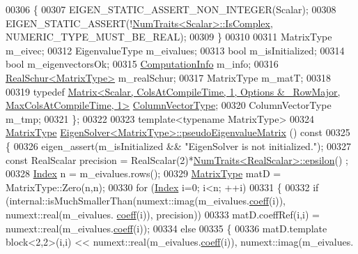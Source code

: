 \begin{DoxyCode}
00306     \{
00307       EIGEN\_STATIC\_ASSERT\_NON\_INTEGER(Scalar);
00308       EIGEN\_STATIC\_ASSERT(!\hyperlink{group___core___module_struct_eigen_1_1_num_traits}{NumTraits<Scalar>::IsComplex}, 
      NUMERIC\_TYPE\_MUST\_BE\_REAL);
00309     \}
00310     
00311     MatrixType m\_eivec;
00312     EigenvalueType m\_eivalues;
00313     \textcolor{keywordtype}{bool} m\_isInitialized;
00314     \textcolor{keywordtype}{bool} m\_eigenvectorsOk;
00315     \hyperlink{group__enums_ga85fad7b87587764e5cf6b513a9e0ee5e}{ComputationInfo} m\_info;
00316     \hyperlink{group___eigenvalues___module}{RealSchur<MatrixType>} m\_realSchur;
00317     MatrixType m\_matT;
00318 
00319     \textcolor{keyword}{typedef} 
      \hyperlink{group___core___module}{Matrix<Scalar, ColsAtCompileTime, 1, Options & ~RowMajor, MaxColsAtCompileTime, 1>}
       \hyperlink{group___core___module}{ColumnVectorType};
00320     ColumnVectorType m\_tmp;
00321 \};
00322 
00323 \textcolor{keyword}{template}<\textcolor{keyword}{typename} MatrixType>
00324 \hyperlink{group___eigenvalues___module_a83acd180404ddaac8a678fa65a6b632b}{MatrixType} \hyperlink{group___eigenvalues___module_a4979eafe0aeef06b19ada7fa5e19db17}{EigenSolver<MatrixType>::pseudoEigenvalueMatrix}
      ()\textcolor{keyword}{ const}
00325 \textcolor{keyword}{}\{
00326   eigen\_assert(m\_isInitialized && \textcolor{stringliteral}{"EigenSolver is not initialized."});
00327   \textcolor{keyword}{const} RealScalar precision = RealScalar(2)*\hyperlink{group___core___module_struct_eigen_1_1_num_traits}{NumTraits<RealScalar>::epsilon}()
      ;
00328   \hyperlink{group___eigenvalues___module_a5bff6a6bc0efac67d52c60c2c3deb9ee}{Index} n = m\_eivalues.rows();
00329   \hyperlink{group___eigenvalues___module_a83acd180404ddaac8a678fa65a6b632b}{MatrixType} matD = MatrixType::Zero(n,n);
00330   \textcolor{keywordflow}{for} (\hyperlink{group___eigenvalues___module_a5bff6a6bc0efac67d52c60c2c3deb9ee}{Index} i=0; i<n; ++i)
00331   \{
00332     \textcolor{keywordflow}{if} (internal::isMuchSmallerThan(numext::imag(m\_eivalues.\hyperlink{class_eigen_1_1_plain_object_base_afbfc12954f16d21aedb7bd839f64a278}{coeff}(i)), numext::real(m\_eivalues.
      \hyperlink{class_eigen_1_1_plain_object_base_afbfc12954f16d21aedb7bd839f64a278}{coeff}(i)), precision))
00333       matD.coeffRef(i,i) = numext::real(m\_eivalues.\hyperlink{class_eigen_1_1_plain_object_base_afbfc12954f16d21aedb7bd839f64a278}{coeff}(i));
00334     \textcolor{keywordflow}{else}
00335     \{
00336       matD.template block<2,2>(i,i) <<  numext::real(m\_eivalues.\hyperlink{class_eigen_1_1_plain_object_base_afbfc12954f16d21aedb7bd839f64a278}{coeff}(i)), numext::imag(m\_eivalues.

\end{DoxyCode}
